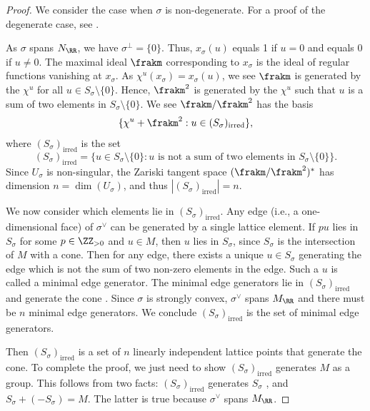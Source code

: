 \documentclass[12pt]{amsart}
\theoremstyle{plain}
\begin{document}
\begin{proof}
We consider the case when $\sigma$ is non-degenerate. For a proof of the degenerate case, see \cite[\S 2.1]{Fulton93}.

As $\sigma$ spans $N_\RR$, we have $\sigma^\perp = \{0\}$.
Thus, $x_\sigma(u)$ equals 1 if $u=0$ and equals 0 if $u \ne 0$.
The maximal ideal $\frakm$ corresponding to $x_\sigma$ is the ideal of regular functions vanishing at $x_\sigma$.
As $\chi^u(x_\sigma) = x_\sigma(u)$, we see $\frakm$ is generated by the $\chi^u$ for all $u \in S_\sigma \setminus \{0\}$.
Hence, $\frakm^2$ is generated by the $\chi^u$ such that $u$ is a sum of two elements in $S_\sigma \setminus \{0\}$.
We see $\frakm / \frakm^2$ has the basis 
$$\{\chi^u + \frakm^2 : u \in (S_\sigma)_{\text{irred}}\},$$
where $(S_\sigma)_{\text{irred}}$ is the set
$$(S_\sigma)_{\text{irred}} = \{u \in S_\sigma \setminus \{0\} : u \text{ is not a sum of two elements in } S_\sigma\setminus\{0\}\}.$$
Since $U_\sigma$ is non-singular, the Zariski tangent space $(\frakm/\frakm^2)^*$ has dimension $n = \dim(U_\sigma)$, and thus $|(S_\sigma)_{\text{irred}}| = n$.

We now consider which elements lie in $(S_\sigma)_{\text{irred}}$.
Any edge (i.e., a one-dimensional face) of $\sigma^\vee$ can be generated by a single lattice element.
If $p u$ lies in $S_\sigma$ for some $p \in \ZZ_{> 0}$ and $u \in M$, then $u$ lies in $S_\sigma$, since $S_\sigma$ is the intersection of $M$ with a cone.
Then for any edge, there exists a unique $u \in S_\sigma$ generating the edge which is not the sum of two non-zero elements in the edge.
Such a $u$ is called a minimal edge generator.
The minimal edge generators lie in $(S_\sigma)_{\text{irred}}$ \cite[Proposition 1.2.23]{CLS11} and generate the cone \cite[Lemma 1.2.15]{CLS11}.
Since $\sigma$ is strongly convex, $\sigma^\vee$ spans $M_\RR$ and there must be $n$ minimal edge generators.
We conclude $(S_\sigma)_{\text{irred}}$ is the set of minimal edge generators.

Then $(S_\sigma)_{\text{irred}}$ is a set of $n$ linearly independent lattice points that generate the cone.
To complete the proof, we just need to show $(S_\sigma)_{\text{irred}}$ generates $M$ as a group.
This follows from two facts: $(S_\sigma)_{\text{irred}}$ generates $S_\sigma$ \cite[Proposition 1.2.23]{CLS11}, and $S_\sigma + (-S_\sigma) = M$.
The latter is true because $\sigma^\vee$ spans $M_\RR$.
\end{proof}
\end{document}

